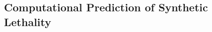 \subsection[Computational Prediction of Synthetic Lethality]{Computational Prediction of Synthetic Lethality}



